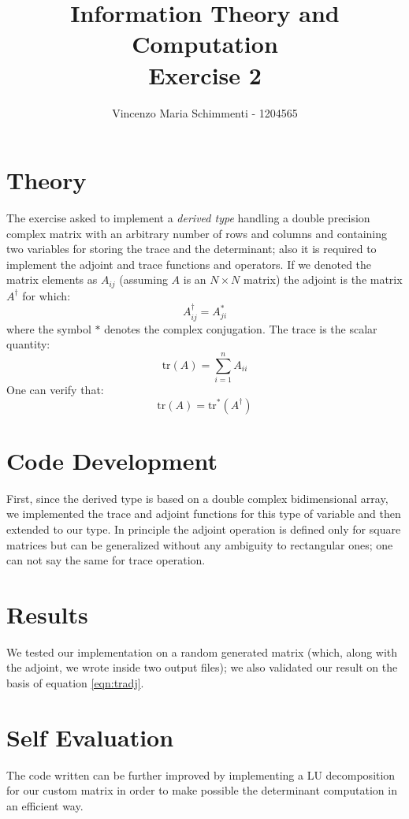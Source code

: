 \documentclass{article}
\title{%
	Information Theory and Computation \\
	Exercise  2}
\author{Vincenzo Maria Schimmenti - 1204565}
\begin{document}
\maketitle
 
\section*{Theory}
The exercise asked to implement a \textit{derived type} handling a double precision complex matrix with an arbitrary number of rows and columns and containing two variables for storing the trace and the determinant; also it is required to implement the adjoint and trace functions and operators. If we denoted the matrix elements as $A_{ij}$ (assuming $A$ is an $N \times N$ matrix) the adjoint is the matrix $A^\dagger$ for which:
\begin{equation}
	A^{\dagger}_{ij}=A^*_{ji}
\end{equation}
where the symbol $*$ denotes the complex conjugation. The trace is the scalar quantity:
\begin{equation}
	\textrm{tr}(A)=\sum_{i=1}^n A_{ii}
\end{equation}
One can verify that:
\begin{equation}
\label{eqn:tradj}
	\textrm{tr}(A)=\textrm{tr}^*(A^\dagger)
\end{equation}
\section*{Code Development}
First, since the derived type is based on a double complex bidimensional array, we implemented the trace and adjoint functions for this type of variable and then extended to our type. In principle the adjoint operation is defined only for square matrices but can be generalized without any ambiguity to rectangular ones; one can not say the same for trace operation.
\section*{Results}
We tested our implementation on a random generated matrix (which, along with the adjoint, we wrote inside two output files); we also validated our result on the basis of equation \ref{eqn:tradj}.
\section*{Self Evaluation}
The code written can be further improved by implementing a LU decomposition for our custom matrix in order to make possible the determinant computation in an efficient way.
\end{document}
